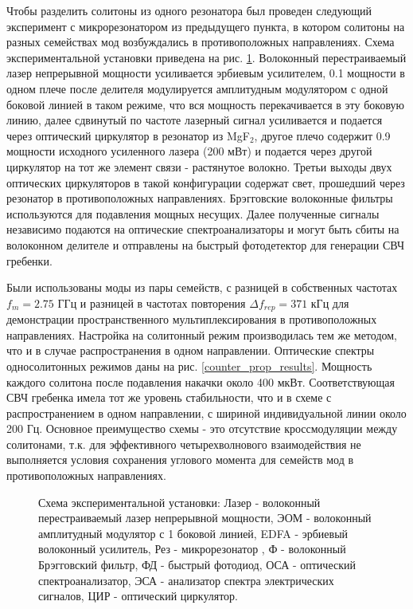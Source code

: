 Чтобы разделить солитоны из одного резонатора был проведен следующий эксперимент с микрорезонатором из предыдущего пункта, в котором солитоны на разных семействах мод возбуждались в противоположных направлениях. Схема экспериментальной установки приведена на рис. \ref{Setup_CounterProp}. Волоконный перестраиваемый лазер непрерывной мощности усиливается эрбиевым усилителем, 0.1 мощности в одном плече после делителя модулируется амплитудным модулятором с одной боковой линией в таком режиме, что вся мощность перекачивается в эту боковую линию, далее сдвинутый по частоте лазерный сигнал усиливается и подается через оптический циркулятор в резонатор из MgF$_2$, другое плечо содержит 0.9 мощности исходного усиленного лазера (200 мВт) и подается через другой циркулятор на тот же элемент связи - растянутое волокно. Третьи выходы двух оптических циркуляторов в такой конфигурации содержат свет, прошедший через резонатор в противоположных направлениях. Брэгговские волоконные фильтры используются для подавления мощных несущих. Далее полученные сигналы независимо подаются на оптические спектроанализаторы и могут быть сбиты на волоконном делителе и отправлены на быстрый фотодетектор для генерации СВЧ гребенки.

Были использованы моды из пары семейств, с разницей в собственных частотах $f_m=2.75$ ГГц и разницей в частотах повторения $\Delta f_{rep}=371$ кГц для демонстрации пространственного мультиплексирования в противоположных направлениях. Настройка на солитонный режим производилась тем же методом, что и в случае распространения в одном направлении. Оптические спектры односолитонных режимов даны на рис. \ref{counter_prop_results}. Мощность каждого солитона после подавления накачки около 400 мкВт. Соответствующая СВЧ гребенка имела тот же уровень стабильности, что и в схеме с распространением в одном направлении, с шириной индивидуальной линии около 200 Гц. Основное преимущество схемы - это отсутствие кроссмодуляции между солитонами, т.к. для эффективного четырехволнового взаимодействия не выполняется условия сохранения углового момента для семейств мод в противоположных направлениях.

\begin{figure}[!htb]
\begin{minipage}{1\linewidth}
\end{minipage}
\caption{Схема экспериментальной установки: Лазер - волоконный перестраиваемый лазер непрерывной мощности, ЭОМ - волоконный амплитудный модулятор с 1 боковой линией, EDFA - эрбиевый волоконный усилитель, Рез - микрорезонатор , Ф - волоконный Брэгговский фильтр, ФД - быстрый фотодиод, ОСА - оптический спектроанализатор, ЭСА - анализатор спектра электрических сигналов, ЦИР - оптический циркулятор.}
\label{Setup_CounterProp}
\end{figure}

